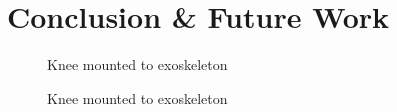 \chapter{Conclusion \& Future Work}


\begin{figure}[ht!]
    \centering
    \caption{Knee mounted to exoskeleton}
    \label{fig:KneeOnExo}
\end{figure}

\begin{figure}[ht!]
    \centering
    \caption{Knee mounted to exoskeleton}
    \label{fig:KneeJointPicture}
\end{figure}